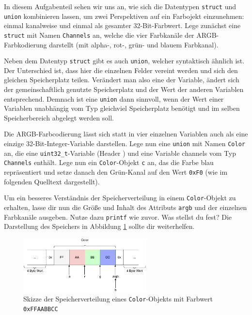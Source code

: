 \optionaltextboxC
{}
In diesem Aufgabenteil sehen wir uns an, wie sich die Datentypen \lstinline|struct| und \lstinline|union| kombinieren lassen, um zwei Perspektiven auf ein Farbojekt einzunehmen: einmal kanalweise und einmal als gesamter 32-Bit-Farbwert.
Lege zunächst eine \lstinline|struct| mit Namen \lstinline|Channels| an, welche die vier Farbkanäle der ARGB-Farbkodierung darstellt (mit alpha-, rot-, grün- und blauem Farbkanal). 



Neben dem Datentyp \lstinline|struct| gibt es auch \lstinline|union|, welcher syntaktisch ähnlich ist.
Der Unterschied ist, dass hier die einzelnen Felder vereint werden und sich den gleichen Speicherplatz teilen. 
Verändert man also eine der Variable, ändert sich der gemeinschaftlich genutzte Speicherplatz und der Wert der anderen Variablen entsprechend. 
Demnach ist eine \lstinline|union| dann sinnvoll, wenn der Wert einer Variablen unabhängig vom Typ gleichviel Speicherplatz benötigt und im selben Speicherbereich abgelegt werden soll.

Die ARGB-Farbcodierung lässt sich statt in vier einzelnen Variablen auch als eine einzige 32-Bit-Integer-Variable darstellen.
Lege nun eine \lstinline|union| mit Namen \lstinline|Color| an, die eine \lstinline|uint32_t|-Variable (Header ) und eine Variable channels vom Typ \lstinline|Channels| enthält.
Lege nun ein \lstinline|Color|-Objekt \lstinline|c| an, das die Farbe blau repräsentiert und setze danach den Grün-Kanal auf den Wert \lstinline|0xF0| (wie im folgenden Quelltext dargestellt).


Um ein besseres Verständnis der Speicherverteilung in einem \lstinline|Color|-Objekt zu erhalten, lasse dir nun die Größe und Inhalt des Attributs \lstinline|argb| und der einzelnen Farbkanäle ausgeben.
Nutze dazu \lstinline{printf} wie zuvor. 
Was stellst du fest? 
Die Darstellung des Speichers in Abbildung \ref{fig:color_channels} sollte dir weiterhelfen.

\begin{figure}[!htb]
	\centering
	\includegraphics[width=0.6\textwidth]{./05_c/figures/Color_Channels.pdf}
	\caption{Skizze der Speicherverteilung eines \lstinline|Color|-Objekts mit Farbwert \lstinline|0xFFAABBCC|}
	\label{fig:color_channels}
\end{figure} 

